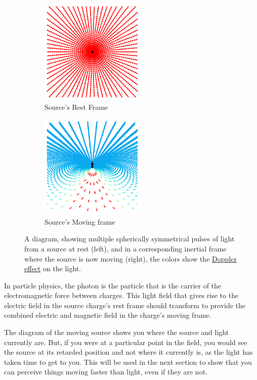 \begin{figure}[H]
	\begin{subfigure}{.49\textwidth}
		\centering
		\includegraphics[width = 5cm]{images/pdf/Field_Rest_Frame.pdf}
		\caption{Source's Rest Frame}
		\label{fig: multiple emitting pulses rest frame}
	\end{subfigure}
	\begin{subfigure}{.49\textwidth}
		\centering
		\includegraphics[width = 5cm]{images/pdf/Field_Moving_Frame_Doppler.pdf}
		\caption{Source's Moving frame}
		\label{fig: multiple emitting pulses moving frame}
	\end{subfigure}
	\caption{A diagram, showing multiple spherically symmetrical pulses of light from a source at rest (left), and in a corresponding inertial frame where the source is now moving (right), the colors show the \protect\hyperlink{def-doppler-effect}{Doppler effect} on the light.} %
	\label{fig: full field transformation 0}
\end{figure}

In particle physics, the photon is the particle that is the carrier of the electromagnetic force between charges.
This light field that gives rise to the electric field in the source charge's rest frame should transform to provide the combined electric and magnetic field in the charge's moving frame.

The diagram of the moving source shows you where the source and light currently are.
But, if you were at a particular point in the field, you would see the source at its retarded position and not where it currently is, as the light has taken time to get to you.
This will be used in the next section to show that you can perceive things moving faster than light, even if they are not.

